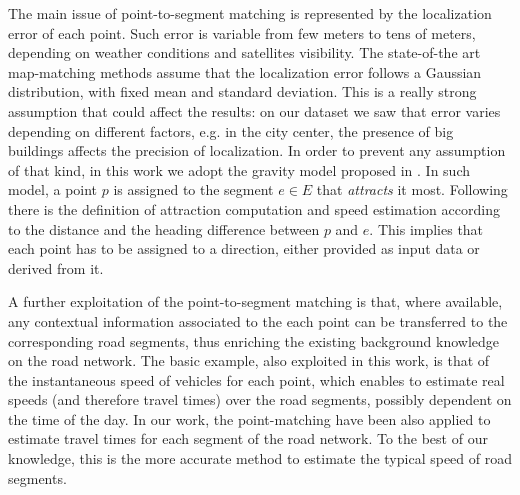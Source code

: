 \documentclass[5p]{elsarticle}
\begin{document}
The main issue of point-to-segment matching is represented by the localization error of each point. Such error is variable from few meters to tens of meters, 
depending on weather conditions and satellites visibility. 
The state-of-the art map-matching methods assume that the localization error follows a Gaussian distribution, with fixed mean and standard deviation. This is a really strong assumption 
that could affect the results: 
on our dataset we saw that error varies depending on different factors, e.g. in the city center, the presence of big buildings affects the precision of localization. 
In order to prevent any assumption of that kind, in this work we adopt the gravity model proposed in \cite{cintia2013gravity}.
In such model, a point $p$ is assigned to the segment $e \in E$ that {\em attracts} it most. Following there is the definition of attraction computation and speed estimation according
to the distance and the heading difference between $p$ and $e$. 
This implies that each point has to be assigned to a direction, either provided as input data or derived from it. 


A further exploitation of the point-to-segment matching is that, where available, any contextual information associated to the each point can be transferred to the corresponding road segments, 
thus enriching the existing background knowledge on the road network. The basic example, also exploited in this work, is that of the instantaneous speed of vehicles for each point, 
which enables to estimate real speeds (and therefore travel times) over the road segments, possibly dependent on the time of the day. In our work, the point-matching have been
also applied to estimate travel times for each segment of the road network. To the best of our knowledge, this is the more accurate
method to estimate the typical speed of road segments.  \\
\end{document}
